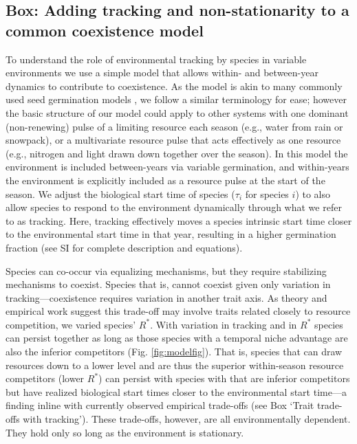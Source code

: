 \documentclass[11pt,letterpaper]{article}
\newcommand{\R}[1]{\label{#1}\linelabel{#1}}
\begin{document}
\subsection{Box: Adding tracking and non-stationarity to a common coexistence model} %
To understand the role of environmental tracking by species in variable environments we use a simple model that allows within- and between-year dynamics to contribute to coexistence. As the model is akin to many commonly used seed germination models \citep{Chesson:2004eo}, we follow a similar terminology for ease; however the basic structure of our model could apply to other systems with one dominant (non-renewing) \R{nonrenew} pulse of a limiting resource each season (e.g., water from rain or snowpack), or a multivariate resource pulse that acts effectively as one resource (e.g., nitrogen and light drawn down together over the season). In this model the environment is included between-years via variable germination, and within-years the environment is explicitly included as a resource pulse at the start of the season. We adjust the biological start time of species ($\tau_i$ for species $i$) to also allow species to respond to the environment dynamically through what we refer to as tracking. Here, tracking effectively moves a species intrinsic start time closer to the environmental start time in that year, resulting in a higher germination fraction (see SI for complete description and equations).

Species can co-occur via equalizing mechanisms, but they require stabilizing mechanisms to coexist. Species that is, cannot coexist given only variation in tracking---coexistence requires variation in another trait axis. As theory and empirical work suggest this trade-off may involve traits related closely to resource competition, we varied species' $R^*$. With variation in tracking and in $R^*$ species can persist together as long as those species with a temporal niche advantage are also the inferior competitors (Fig. \ref{fig:modelfig}). That is, species that can draw resources down to a lower level and are thus the superior within-season resource competitors (lower $R^*$) can persist with species with that are inferior competitors but have realized biological start times closer to the environmental start time---a finding inline with currently observed empirical trade-offs (see Box `Trait trade-offs with tracking'). These trade-offs, however, are all environmentally dependent. They hold only so long as the environment is stationary. 
\end{document}
